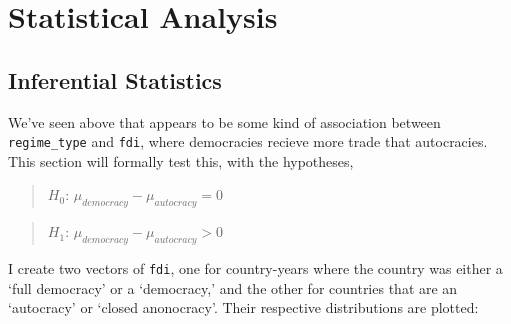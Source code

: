 \documentclass[11pt,]{article}
\begin{document}
\hypertarget{statistical-analysis}{%
\section{Statistical Analysis}\label{statistical-analysis}}

\hypertarget{inferential-statistics}{%
\subsection{Inferential Statistics}\label{inferential-statistics}}

We've seen above that appears to be some kind of association between
\texttt{regime\_type} and \texttt{fdi}, where democracies recieve more
trade that autocracies. This section will formally test this, with the
hypotheses,

\begin{quote}
\(H_0\): \(\mu_{democracy} - \mu_{autocracy} = 0\)
\end{quote}

\begin{quote}
\(H_1\): \(\mu_{democracy} - \mu_{autocracy} > 0\)
\end{quote}

I create two vectors of \texttt{fdi}, one for country-years where the
country was either a `full democracy' or a `democracy,' and the other
for countries that are an `autocracy' or `closed anonocracy'. Their
respective distributions are plotted:
\end{document}
